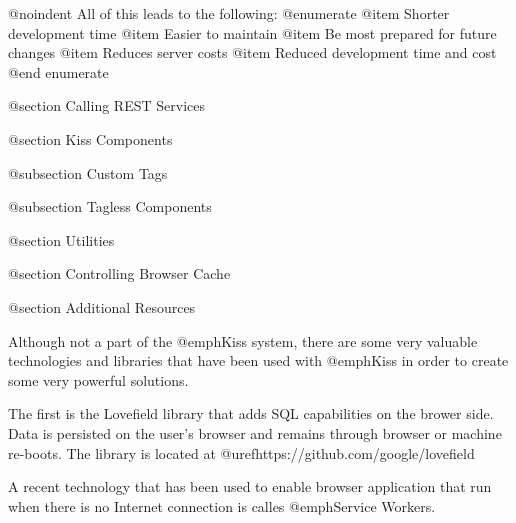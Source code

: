 @noindent
All of this leads to the following:
@enumerate
@item
Shorter development time
@item 
Easier to maintain
@item
Be most prepared for future changes
@item
Reduces server costs
@item
Reduced development time and cost
@end enumerate



@section Calling REST Services

@section Kiss Components

@subsection Custom Tags

@subsection Tagless Components

@section Utilities

@section Controlling Browser Cache

@section Additional Resources

Although not a part of the @emph{Kiss} system, there are some very valuable technologies and libraries that
have been used with @emph{Kiss} in order to create some very powerful solutions.

The first is the Lovefield library that adds SQL capabilities on the brower side.  Data is persisted on the user's browser
and remains through browser or machine re-boots.  The library is located at @uref{https://github.com/google/lovefield}

A recent technology that has been used to enable browser application that run when there is no Internet connection
is calles @emph{Service Workers}.

